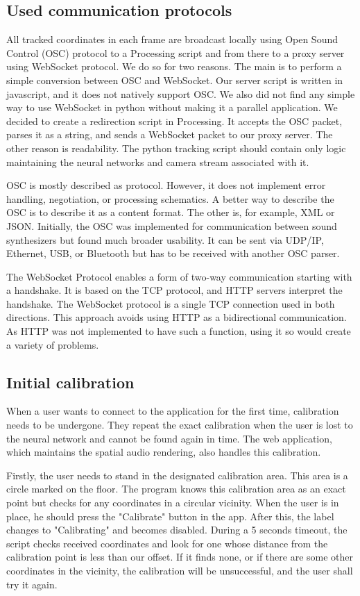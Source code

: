 \documentclass{ctuthesis}
\begin{document}
\subsection{Used communication protocols}
All tracked coordinates in each frame are broadcast locally using Open Sound Control (OSC) protocol to a Processing\cite{94} script and from there to a proxy server using WebSocket protocol. We do so for two reasons. The main is to perform a simple conversion between OSC and WebSocket. Our server script is written in javascript, and it does not natively support OSC. We also did not find any simple way to use WebSocket in python without making it a parallel application. We decided to create a redirection script in Processing. It accepts the OSC packet, parses it as a string, and sends a WebSocket packet to our proxy server. The other reason is readability. The python tracking script should contain only logic maintaining the neural networks and camera stream associated with it.

OSC is mostly described as protocol. However, it does not implement error handling, negotiation, or processing schematics. A better way to describe the OSC is to describe it as a content format. The other is, for example, XML or JSON. Initially, the OSC was implemented for communication between sound synthesizers but found much broader usability. It can be sent via UDP/IP, Ethernet, USB, or Bluetooth but has to be received with another OSC parser\cite{93}.

The WebSocket Protocol enables a form of two-way communication starting with a handshake. It is based on the TCP protocol, and HTTP servers interpret the handshake. The WebSocket protocol is a single TCP connection used in both directions. This approach avoids using HTTP as a bidirectional communication. As HTTP was not implemented to have such a function, using it so would create a variety of problems\cite{92}. 

\subsection{Initial calibration} \label{calibration}
When a user wants to connect to the application for the first time, calibration needs to be undergone. They repeat the exact calibration when the user is lost to the neural network and cannot be found again in time. The web application, which maintains the spatial audio rendering, also handles this calibration.

Firstly, the user needs to stand in the designated calibration area. This area is a circle marked on the floor. The program knows this calibration area as an exact point but checks for any coordinates in a circular vicinity. When the user is in place, he should press the "Calibrate" button in the app. After this, the label changes to "Calibrating" and becomes disabled. During a 5 seconds timeout, the script checks received coordinates and look for one whose distance from the calibration point is less than our offset. If it finds none, or if there are some other coordinates in the vicinity, the calibration will be unsuccessful, and the user shall try it again.
\end{document}
